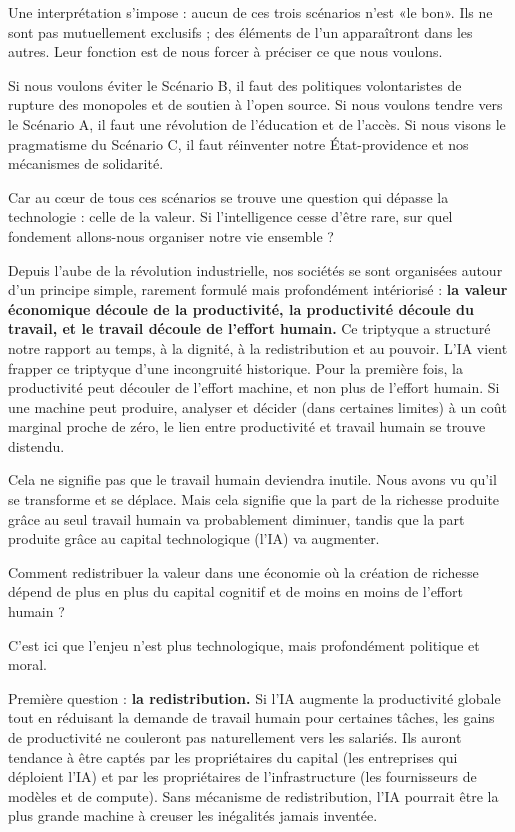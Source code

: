 Une interprétation s'impose : aucun de ces trois scénarios n'est «le bon». Ils ne sont pas mutuellement exclusifs ; des éléments de l'un apparaîtront dans les autres. Leur fonction est de nous forcer à préciser ce que nous voulons.

Si nous voulons éviter le Scénario B, il faut des politiques volontaristes de rupture des monopoles et de soutien à l'open source. Si nous voulons tendre vers le Scénario A, il faut une révolution de l'éducation et de l'accès. Si nous visons le pragmatisme du Scénario C, il faut réinventer notre État-providence et nos mécanismes de solidarité.

Car au cœur de tous ces scénarios se trouve une question qui dépasse la technologie : celle de la valeur. Si l'intelligence cesse d'être rare, sur quel fondement allons-nous organiser notre vie ensemble ?


Depuis l'aube de la révolution industrielle, nos sociétés se sont organisées autour d'un principe simple, rarement formulé mais profondément intériorisé : \textbf{la valeur économique découle de la productivité, la productivité découle du travail, et le travail découle de l'effort humain.} Ce triptyque a structuré notre rapport au temps, à la dignité, à la redistribution et au pouvoir. L'IA vient frapper ce triptyque d'une incongruité historique. Pour la première fois, la productivité peut découler de l'effort machine, et non plus de l'effort humain. Si une machine peut produire, analyser et décider (dans certaines limites) à un coût marginal proche de zéro, le lien entre productivité et travail humain se trouve distendu.

Cela ne signifie pas que le travail humain deviendra inutile. Nous avons vu qu'il se transforme et se déplace. Mais cela signifie que la part de la richesse produite grâce au seul travail humain va probablement diminuer, tandis que la part produite grâce au capital technologique (l'IA) va augmenter.

\begin{aiquote}
Comment redistribuer la valeur dans une économie où la création de richesse dépend de plus en plus du capital cognitif et de moins en moins de l'effort humain ?
\end{aiquote}

C'est ici que l'enjeu n'est plus technologique, mais profondément politique et moral.

Première question : \textbf{la redistribution.} Si l'IA augmente la productivité globale tout en réduisant la demande de travail humain pour certaines tâches, les gains de productivité ne couleront pas naturellement vers les salariés. Ils auront tendance à être captés par les propriétaires du capital (les entreprises qui déploient l'IA) et par les propriétaires de l'infrastructure (les fournisseurs de modèles et de compute). Sans mécanisme de redistribution, l'IA pourrait être la plus grande machine à creuser les inégalités jamais inventée.

